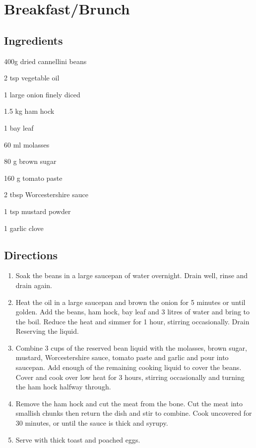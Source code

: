 \chapter{Breakfast/Brunch}
\section*{Ingredients}
\begin{ingredients-list}
	\item 400g dried cannellini beans
	\item 2 tsp vegetable oil
	\item 1 large onion finely diced
	\item 1.5 kg ham hock
	\item 1 bay leaf
	\item 60 ml molasses
	\item 80 g brown sugar
	\item 160 g tomato paste
	\item 2 tbsp Worcestershire sauce
	\item 1 tsp mustard powder
	\item 1 garlic clove 
\end{ingredients-list}

\section*{Directions}
\begin{enumerate}
	\item Soak the beans in a large saucepan of water overnight. Drain well, rinse and drain again.
	\item Heat the oil in a large saucepan and brown the onion for 5 minutes or until golden. Add the beans, ham hock, bay leaf and 3 litres of water and bring to the boil.
		Reduce the heat and simmer for 1 hour, stirring occasionally.  Drain Reserving the liquid.
	\item Combine 3 cups of the reserved bean liquid with the molasses, brown sugar, mustard, Worcestershire sauce, tomato paste and garlic and pour into saucepan.
		Add enough of the remaining cooking liquid to cover the beans. Cover and cook over low heat for 3 hours, stirring occasionally and turning the ham hock halfway through.
	\item Remove the ham hock and cut the meat from the bone. Cut the meat into smallish chunks then return the dish and stir to combine.
		Cook uncovered for 30 minutes, or until the sauce is thick and syrupy.
	\item Serve with thick toast and poached eggs.
\end{enumerate}

